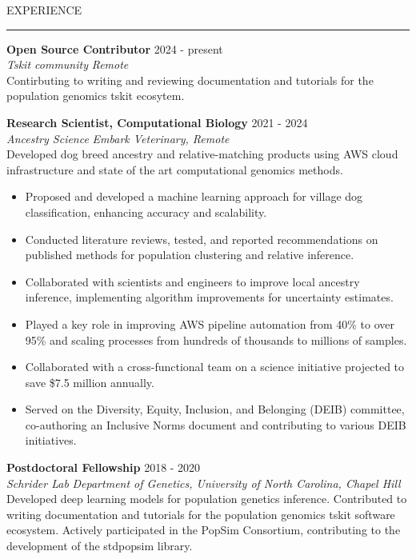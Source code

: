 \documentclass{resume} %
\renewenvironment{rSection}[1]{
\sectionskip
\textcolor{RoyalPurple}{\MakeUppercase{#1}}
\sectionlineskip
\hrule
\begin{list}{}{
\setlength{\leftmargin}{1.5em}
}
\item[]
}{
\end{list}
}
\begin{document}
\begin{rSection}{Experience}

{\bf Open Source Contributor} \hfill  2024 - present\\ 
{\em Tskit community} \hfill {\em Remote}\\
Contirbuting to writing and reviewing documentation and tutorials for the population genomics tskit ecosytem.

{\bf Research Scientist, Computational Biology} \hfill  2021 - 2024\\ 
{\em Ancestry Science} \hfill {\em Embark Veterinary, Remote}\\
Developed dog breed ancestry and relative-matching products using AWS cloud infrastructure and state of the art computational genomics methods.
\begin{itemize}[noitemsep, topsep=0pt]
    \item Proposed and developed a machine learning approach for village dog classification, enhancing accuracy and scalability.
    \item Conducted literature reviews, tested, and reported recommendations on published methods for population clustering and relative inference.
    \item Collaborated with scientists and engineers to improve local ancestry inference, implementing algorithm improvements for uncertainty estimates.
    \item Played a key role in improving AWS pipeline automation from 40\% to over 95\% and scaling processes from hundreds of thousands to millions of samples.
    \item Collaborated with a cross-functional team on a science initiative projected to save \$7.5 million annually. 
    \item Served on the Diversity, Equity, Inclusion, and Belonging (DEIB) committee, co-authoring an Inclusive Norms document and contributing to various DEIB initiatives.
\end{itemize}

{\bf Postdoctoral Fellowship} \hfill  2018 - 2020\\ 
{\em Schrider Lab} \hfill {\em Department of Genetics, University of North Carolina, Chapel Hill}\\
Developed deep learning models for population genetics inference. Contributed to writing documentation and tutorials for the population genomics tskit software ecosystem. Actively participated in the PopSim Consortium, contributing to the development of the stdpopsim library.



\end{rSection}
\end{document}
